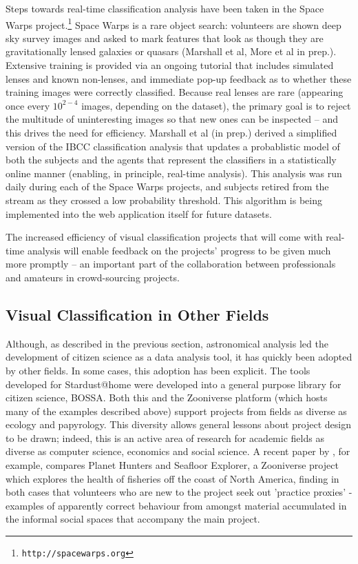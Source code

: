 \documentclass{ar2e}
\def\CaseStudy#1{\noindent{\it\bf #1 \,\,\,\,}}
\def\url#1{\texttt{#1}}
\begin{document}
\CaseStudy{Rare event detection: Space Warps} 
Steps towards real-time classification analysis have been taken in the Space
Warps project.\footnote{\url{http://spacewarps.org}} 
Space Warps is a rare object search: volunteers are shown deep
sky survey images and asked to mark features that look as though they are
gravitationally lensed galaxies or quasars (Marshall et al, More et al in prep.).
Extensive training is
provided via an ongoing tutorial that includes simulated lenses and known
non-lenses, and immediate pop-up feedback as to whether these training images
were correctly classified. Because real lenses are rare (appearing once every
$10^{2-4}$ images, depending on the dataset), the primary goal is to reject the
multitude of uninteresting images so that new ones can be inspected -- and this
drives the need for efficiency. Marshall et al (in prep.) derived a
simplified version of the IBCC classification analysis that updates a
probablistic model of both the subjects and the agents that represent the
classifiers in a statistically online manner (enabling, in principle, real-time
analysis). This
analysis was run daily during each of the Space Warps projects, and subjects
retired from the stream as they crossed a low probability threshold. This
algorithm is being implemented into the web application itself for future
datasets. 

The increased  efficiency of visual classification projects that will come with
real-time analysis will enable feedback on the projects' progress to be given
much more promptly -- an important part of the collaboration between
professionals and amateurs in crowd-sourcing projects.



\subsection{Visual Classification in Other Fields}
\label{sec:class:non-astro}

Although, as described in the previous section, astronomical analysis led the
development of citizen science as a data analysis tool, it has quickly been
adopted by other fields. In some cases, this adoption has been explicit. The
tools developed for Stardust@home were developed into a general purpose
library for citizen science, BOSSA.
Both this and the Zooniverse platform (which hosts many of the examples
described above) support projects from fields as diverse as ecology and
papyrology. This diversity allows general lessons about project
design to be drawn; indeed, this is an active area of research for academic
fields as diverse as computer science, economics and social science. A recent paper
by \citet{Crowston}, for example, compares Planet Hunters and Seafloor Explorer, 
a Zooniverse project which explores the health of fisheries off the coast of
North America, finding in both cases that volunteers who are new to the project
seek out 'practice proxies' - examples of apparently correct behaviour from amongst
material accumulated in the informal social spaces that accompany the main project.
\end{document}
